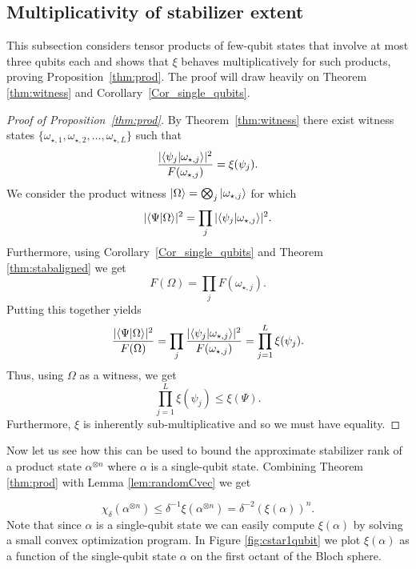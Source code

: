 \subsection{Multiplicativity of stabilizer extent}
\label{Sec_Cstar_multi}
This subsection considers tensor products  of few-qubit states 
that involve at most three qubits each
and shows that $\xi$ behaves multiplicatively for such products, proving Proposition~\ref{thm:prod}. The proof will draw heavily on Theorem \ref{thm:witness} and Corollary~\ref{Cor_single_qubits}.
\begin{proof}[Proof of Proposition~\ref{thm:prod}]
By Theorem~\ref{thm:witness} there exist witness states $\{ \omega_{\star,1} , \omega_{\star,2}  , \ldots , \omega_{\star,L}  \}$ such that
	\begin{equation}
\frac{|\langle \psi_j\vert \omega_{\star, j}\rangle|^2}{F(\omega_{\star, j})} =  \xi(\psi_j).
\end{equation}
We consider the product witness $\vert\Omega \rangle =  \bigotimes_j \vert\omega_{\star,j}\rangle$
for which
\begin{equation}
|\langle \Psi\vert \Omega\rangle|^2 =  \prod_j |\langle \psi_j\vert \omega_{\star,j}\rangle|^2.
\end{equation}
Furthermore,  using Corollary~\ref{Cor_single_qubits} and Theorem \ref{thm:stabaligned} we get
\begin{equation}
	F( \Omega ) = \prod_j  	F( \omega_{\star, j} ) .
\end{equation}
Putting this together yields
\begin{equation}  
\frac{|\langle \Psi\vert \Omega\rangle|^2}{ F( \Omega ) } =  \prod_j  \frac{ |\langle \psi_j\vert \omega_{\star,j}\rangle|^2 }{ F( \omega_{\star, j} ) } = \prod_{j=1}^L  \xi(\psi_j) .
\end{equation}
Thus, using $\Omega$ as a witness, we get
\begin{equation}  
\prod_{j=1}^L  \xi(\psi_j) \leq \xi(\Psi) .
\end{equation}
Furthermore, $\xi$ is inherently sub-multiplicative and so we must have equality. 
\end{proof}
Now let us see how this can be used to bound the approximate stabilizer rank of a product state $\alpha^{\otimes n}$ where $\alpha$ is a single-qubit state. Combining Theorem \ref{thm:prod} with Lemma \ref{lem:randomCvec} we get

\begin{equation}
\chi_{\delta}(\alpha^{\otimes n})\leq \delta^{-1} \xi(\alpha^{\otimes n})=\delta^{-2}(\xi(\alpha))^{n}.
\label{eq:expsingleq}
\end{equation}
Note that since $\alpha$ is a single-qubit state we can easily compute $\xi(\alpha)$ by solving a small convex optimization program.  In Figure \ref{fig:cstar1qubit} we plot $\xi(\alpha)$ as a function of the single-qubit state $\alpha$ on the first octant of the Bloch sphere. 


